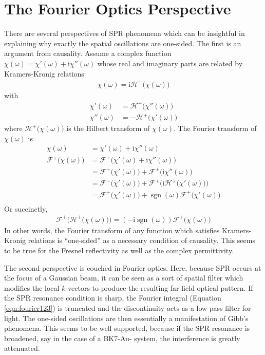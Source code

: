 \documentclass[a4paper,titlepage,onecolumn]{report}
\newcommand{\Equation}[1]{Equation \ref{#1}}
\DeclareMathOperator{\sgn}{sgn}
\newcommand{\mi}{{\mathrm{i}}}
\newcommand{\ff}[1]{{\mathscr{F}^{+}\bigl(#1\bigr)}}
\newcommand{\hf}[1]{{\mathscr{H}^{+}\bigl(#1\bigr)}}
\begin{document}
\section{The Fourier Optics Perspective}
There are several perspectives of SPR phenomena which can be insightful in
explaining why exactly the spatial oscillations are one-sided.  The first
is an argument from causality.  Assume a complex function $\chi(\omega) =
\chi'(\omega) + \mi \chi''(\omega)$ whose real and imaginary parts are
related by Kramers-Kronig relations
\begin{align}
\chi(\omega)=\mi \hf{\chi(\omega)}
\end{align}
with 
\begin{align}
\chi'(\omega) &= \hf{\chi''(\omega)}\\
\chi''(\omega) &= -\hf{\chi'(\omega)}
\end{align}
where $\hf{\chi(\omega)}$ is the Hilbert transform of $\chi(\omega)$.
The Fourier transform of $\chi(\omega)$ is
\begin{align}
\chi(\omega) &= \chi'(\omega) + \mi \chi''(\omega)\\
\ff{\chi(\omega)} &= \ff{\chi'(\omega) + \mi \chi''(\omega)}\\
&= \ff{\chi'(\omega)} + \ff{\mi \chi''(\omega)}\\
&= \ff{\chi'(\omega)} + \ff{\mi \hf{\chi'(\omega)}} \\
&= \ff{\chi'(\omega)} + \sgn(\omega) \ff{\chi'(\omega)} \\
\end{align}
Or succinctly,
\begin{align}
\ff{\hf{\chi(\omega)}} = (-\mi \sgn(\omega)) \ff{\chi(\omega)}
\end{align}
In other words, the Fourier transform of any function which satisfies
Kramers-Kronig relations is ``one-sided'' as a necessary
condition of causality.  This seems to be true for the Fresnel
reflectivity as well as the complex permittivity.

The second perspective is couched in Fourier optics.  Here, because
SPR occurs at the focus of a Gaussian beam, it can be seen as a sort of
spatial filter which modifies the local $k$-vectors to produce
the resulting far field optical pattern.  If the SPR resonance condition is
sharp, the Fourier integral (\Equation{eqn:fourier123}) is truncated and
the discontinuity acts as a low pass filter for light.  The one-sided
oscillations are then essentially a manifestation of Gibb's phenomena.
This seems to be well supported, because if the SPR resonance is broadened,
say in the case of a BK7-Au- system, the interference is greatly
attenuated.
%
\end{document}
